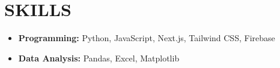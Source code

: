 \section*{SKILLS}
\noindent
\begin{itemize}
	\item \textbf{Programming:} Python, JavaScript, Next.js, Tailwind CSS, Firebase
	\item \textbf{Data Analysis:} Pandas, Excel, Matplotlib
\end{itemize}
